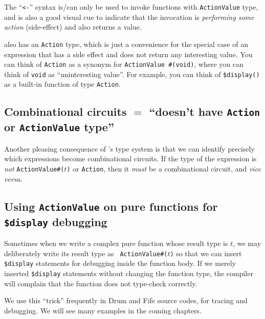 The ``\verb|<-|'' syntax is/can only be used to invoke functions with
\verb|ActionValue| type, and is also a good visual cue to indicate
that the invocation is \emph{performing some action} (side-effect) and
also returns a value.

{\BSV} also has an \verb|Action| type, which is just a convenience for
the special case of an expression that has a side effect and does not
return any interesting value.  You can think of \verb|Action| as a
synonym for \verb|ActionValue #(void)|, where you can think of
\verb|void| as ``uninteresting value''.  For example, you can think of
\verb|$display()| as a built-in function of type \verb|Action|.


\subsection{Combinational circuits $=$ ``doesn't have {\tt Action} or {\tt ActionValue} type''}


Another pleasing consequence of {\BSV}'s type system is that we can
identify precisely which expressions become combinational circuits.
If the type of the expression is \emph{not} {\tt ActionValue\#($t$)}
or {\tt Action}, then it \emph{must} be a combinational circuit, and
\emph{vice versa}.


\subsection{Using {\tt ActionValue} on pure functions for {\tt \$display} debugging}

Sometimes when we write a complex pure function whose result type is
$t$, we may deliberately write its result type as {\tt
ActionValue\#($t$)} so that we can insert \verb|$display| statements
for debugging inside the function body.  If we merely inserted
\verb|$display| statements without changing the function type, the
compiler will complain that the function does not type-check
correctly.

We use this ``trick'' frequently in Drum and Fife source codes, for
tracing and debugging.  We will see many examples in the coming
chapters.


